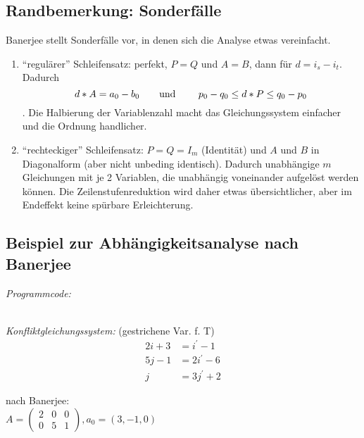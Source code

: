 \subsection{Randbemerkung: Sonderfälle}
Banerjee stellt Sonderfälle vor, in denen sich die Analyse etwas vereinfacht.
\begin{enumerate}
\item ``regulärer'' Schleifensatz: perfekt, $P=Q$ und $A=B$, dann für $d
  = i_s-i_t$. Dadurch $$ d * A = a_0-b_0 \hbox{\qquad und \qquad} p_0-q_0 \leq
  d*P \leq q_0-p_0$$. Die Halbierung der Variablenzahl macht das
  Gleichungssystem einfacher und die Ordnung handlicher.
\item ``rechteckiger'' Schleifensatz: $P=Q=I_m$ (Identität) und $A$ und
  $B$ in Diagonalform (aber nicht unbeding identisch). Dadurch
  unabhängige $m$ Gleichungen mit je 2 Variablen, die unabhängig
  voneinander aufgelöst werden können. Die Zeilenstufenreduktion wird
  daher etwas übersichtlicher, aber im Endeffekt keine spürbare
  Erleichterung.
\end{enumerate}

\subsection{Beispiel zur Abhängigkeitsanalyse nach Banerjee}
\textit{Programmcode:}\\

\begin{procedure}
\SetLine
{}
\end{procedure}
~\\
\textit{Konfliktgleichungssystem:} (gestrichene Var. f. T)\\

\begin{align*}
2i+3 &= i^\prime  - 1\\
5j-1 &= 2i^\prime - 6\\
 j   &= 3j^\prime + 2
\end{align*}

nach Banerjee:\\

$A=
\left(
\begin{array}{ccc}
2 & 0 & 0\\
0 & 5 & 1
\end{array}
\right), a_0 = (3,-1,0)$

